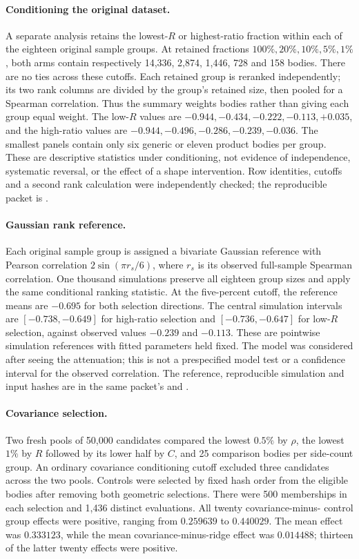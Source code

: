 \paragraph{Conditioning the original dataset.}
A separate analysis retains the lowest-$R$ or highest-ratio fraction within
each of the eighteen original sample groups. At retained fractions
$100\%,20\%,10\%,5\%,1\%$, both arms contain respectively
14,336, 2,874, 1,446, 728 and 158 bodies. There are no ties across these
cutoffs. Each retained group is reranked independently; its two rank
columns are divided by the group's retained size, then pooled for a
Spearman correlation. Thus the summary weights bodies rather than giving
each group equal weight. The low-$R$ values are
$-0.944,-0.434,-0.222,-0.113,+0.035$, and the high-ratio values are
$-0.944,-0.496,-0.286,-0.239,-0.036$. The smallest panels contain only
six generic or eleven product bodies per group. These are descriptive
statistics under conditioning, not evidence of independence, systematic
reversal, or the effect of a shape intervention. Row identities, cutoffs
and a second rank calculation were independently checked; the reproducible
packet is .

\paragraph{Gaussian rank reference.}
Each original sample group is assigned a bivariate Gaussian reference
with Pearson correlation $2\sin(\pi r_s/6)$, where $r_s$ is its observed
full-sample Spearman correlation. One thousand simulations preserve all
eighteen group sizes and apply the same conditional ranking statistic.
At the five-percent cutoff, the reference means are $-0.695$ for both
selection directions. The central simulation intervals are
$[-0.738,-0.649]$ for high-ratio selection and $[-0.736,-0.647]$ for
low-$R$ selection, against observed values $-0.239$ and $-0.113$.
These are pointwise simulation references with fitted parameters held
fixed. The model was considered after seeing the attenuation; this is
not a prespecified model test or a confidence interval for the observed
correlation. The reference, reproducible simulation and input hashes are
in the same packet's  and
.

\paragraph{Covariance selection.}
Two fresh pools of 50,000 candidates compared the lowest $0.5\%$ by
$\rho$, the lowest $1\%$ by $R$ followed by its lower half by $C$, and
25 comparison bodies per side-count group. An ordinary covariance
conditioning cutoff excluded three candidates across the two pools.
Controls were selected by fixed hash order from the eligible bodies after
removing both geometric selections. There were 500 memberships in each
selection and 1,436 distinct evaluations. All twenty covariance-minus-
control group effects were positive, ranging from $0.259639$ to $0.440029$.
The mean effect was $0.333123$, while the mean covariance-minus-ridge
effect was $0.014488$; thirteen of the latter twenty effects were positive.


